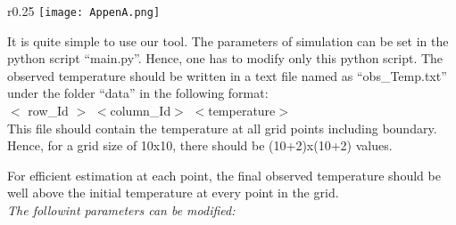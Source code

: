 \documentclass[10pt,a4paper]{report}
\begin{document}
\begin{appendices}
\begin{wrapfigure}{r}{0.25\textwidth} %
    \centering
    \texttt{[image: AppenA.png]}
\end{wrapfigure}
It is quite simple to use our tool. The parameters of simulation can be set in the python script “main.py”. Hence, one has to modify only this python script. The observed temperature should be  written in a text file named as  “obs\_Temp.txt” under the folder “data” in the following format:\\

$<$ row\_Id $>$ \;     $<$column\_Id$>$  \;   $<$temperature$>$\\

This file should contain the temperature at all grid points including boundary. Hence, for a grid size of 10x10, there should be (10+2)x(10+2) values.

For efficient estimation at each point, the final observed temperature should be well above the initial temperature at every point in the grid. \\

\textit{The followint parameters can be modified:}





\end{appendices}
\end{document}
